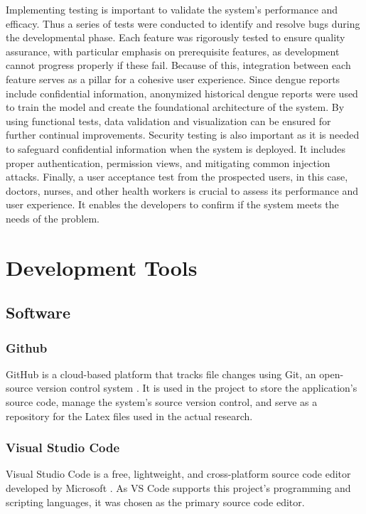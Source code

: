 Implementing testing is important to validate the system's performance and efficacy. Thus a series of tests were conducted to identify and resolve bugs during the developmental phase. Each feature was rigorously tested to ensure quality assurance, with particular emphasis on prerequisite features, as development cannot progress properly if these fail. Because of this, integration between each feature serves as a pillar for a cohesive user experience. Since dengue reports include confidential information, anonymized historical dengue reports were used to train the model and create the foundational architecture of the system. By using functional tests, data validation and visualization can be ensured for further continual improvements. Security testing is also important as it is needed to safeguard confidential information when the system is deployed. It includes proper authentication, permission views, and mitigating common injection attacks. Finally, a user acceptance test from the prospected users, in this case, doctors, nurses, and other health workers is crucial to assess its performance and user experience. It enables the developers to confirm if the system meets the needs of the problem.

\section{Development Tools}
\subsection{Software}

\subsubsection{Github}
GitHub is a cloud-based platform that tracks file changes using Git, an open-source version control system \cite{github-no-date}. It is used in the project to store the application's source code, manage the system's source version control, and serve as a repository for the Latex files used in the actual research.

\subsubsection{Visual Studio Code}
Visual Studio Code is a free, lightweight, and cross-platform source code editor developed by Microsoft \cite{vscode-2021}. As VS Code supports this project's programming and scripting languages, it was chosen as the primary source code editor.

